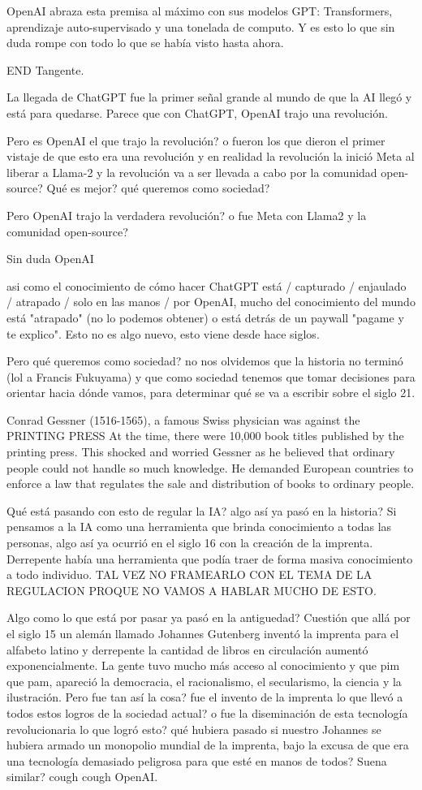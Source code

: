 OpenAI abraza esta premisa al máximo con sus modelos GPT: Transformers, aprendizaje auto-supervisado y una tonelada de computo. Y es esto
lo que sin duda rompe con todo lo que se había visto hasta ahora. 


END Tangente. 


La llegada de ChatGPT fue la primer señal grande al mundo de que la AI llegó y está para quedarse. 
Parece que con ChatGPT, OpenAI trajo una revolución. 

Pero es OpenAI el que trajo la revolución? o fueron los que dieron el primer vistaje de que esto era una revolución y en realidad la revolución
la inició Meta al liberar a Llama-2 y la revolución va a ser llevada a cabo por la comunidad open-source?
Qué es mejor? qué queremos como sociedad?

Pero OpenAI trajo la verdadera revolución? o fue Meta con Llama2 y la comunidad open-source?

Sin duda OpenAI 

asi como el conocimiento de cómo hacer ChatGPT está / capturado / enjaulado / atrapado / solo en las manos / por OpenAI, 
mucho del conocimiento del mundo está "atrapado" (no lo podemos obtener) o está detrás de un paywall "pagame y te explico". 
Esto no es algo nuevo, esto viene desde hace siglos. 


Pero qué queremos como sociedad? no nos olvidemos que la historia no terminó (lol a Francis Fukuyama) y que como sociedad
tenemos que tomar decisiones para orientar hacia dónde vamos, para determinar qué se va a escribir sobre el siglo 21. 

Conrad Gessner (1516-1565), a famous Swiss physician was against the PRINTING PRESS At the time, there were 10,000 book titles published by the printing press.
This shocked and worried Gessner as he believed that ordinary people could not handle so much knowledge. 
He demanded European countries to enforce a law that regulates the sale and distribution of books to ordinary people. 


Qué está pasando con esto de regular la IA? algo así ya pasó en la historia?
Si pensamos a la IA como una herramienta que brinda conocimiento a todas las personas, algo así ya ocurrió en el siglo 16 con la 
creación de la imprenta. Derrepente había una herramienta que podía traer de forma masiva conocimiento a todo individuo. 
TAL VEZ NO FRAMEARLO CON EL TEMA DE LA REGULACION PROQUE NO VAMOS A HABLAR MUCHO DE ESTO. 

Algo como lo que está por pasar ya pasó en la antiguedad?
Cuestión que allá por el siglo 15 un alemán llamado Johannes Gutenberg inventó la imprenta para el alfabeto latino y derrepente la cantidad de libros
en circulación aumentó exponencialmente. La gente tuvo mucho más acceso al conocimiento y que pim que pam, 
apareció la democracia, el racionalismo, el secularismo, la ciencia y la ilustración. 
Pero fue tan así la cosa? fue el invento de la imprenta lo que llevó a todos estos logros de la sociedad actual?
o fue la diseminación de esta tecnología revolucionaria lo que logró esto? qué hubiera pasado si nuestro Johannes
se hubiera armado un monopolio mundial de la imprenta, bajo la excusa de que era una tecnología demasiado peligrosa
para que esté en manos de todos?
Suena similar? cough cough OpenAI. 


